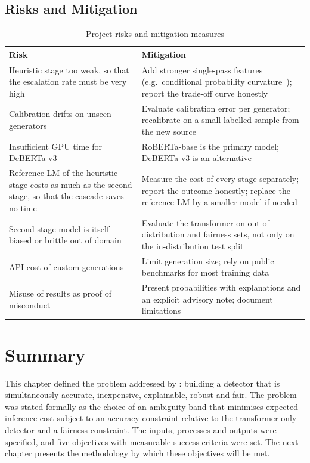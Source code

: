 \subsection{Risks and Mitigation}

\begin{table}[H]
\caption{Project risks and mitigation measures}
\label{tab:risks}
\centering
\small
\begin{tabularx}{\textwidth}{|p{4.2cm}|L|}
\hline
\textbf{Risk} & \textbf{Mitigation} \\ \hline
Heuristic stage too weak, so that the escalation rate must be very high & Add stronger single-pass features (e.g.\ conditional probability curvature~\cite{bao2024fast}); report the trade-off curve honestly \\ \hline
Calibration drifts on unseen generators & Evaluate calibration error per generator; recalibrate on a small labelled sample from the new source \\ \hline
Insufficient GPU time for DeBERTa-v3 & RoBERTa-base is the primary model; DeBERTa-v3 is an alternative \\ \hline
Reference LM of the heuristic stage costs as much as the second stage, so that the cascade saves no time & Measure the cost of every stage separately; report the outcome honestly; replace the reference LM by a smaller model if needed \\ \hline
Second-stage model is itself biased or brittle out of domain & Evaluate the transformer on out-of-distribution and fairness sets, not only on the in-distribution test split \\ \hline
API cost of custom generations & Limit generation size; rely on public benchmarks for most training data \\ \hline
Misuse of results as proof of misconduct & Present probabilities with explanations and an explicit advisory note; document limitations \\ \hline
\end{tabularx}
\end{table}

\section{Summary}

This chapter defined the problem addressed by \veriscript{}: building a
detector that is simultaneously accurate, inexpensive, explainable, robust and
fair. The problem was stated formally as the choice of an ambiguity band that
minimises expected inference cost subject to an accuracy constraint relative
to the transformer-only detector and a fairness constraint. The inputs,
processes and outputs were specified, and five objectives with measurable
success criteria were set. The next chapter presents the methodology by which
these objectives will be met.
